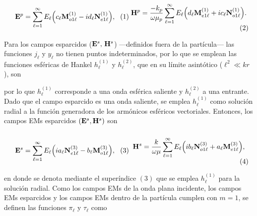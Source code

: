 	\begin{subequations}
	\eqhalf{\vb{E}^p = \sum_{\ell =1}^\infty E_\ell \qty(c_\ell \vb{M}_{o1\ell}^{(1)}-i d_\ell\vb{N}_{e1\ell}^{(1)}),	\label{eqs:EpAEV}}
	\eqhalf{\vb{H}^p = \frac{-k_p}{\omega\mu_p} \sum_{\ell =1}^\infty E_\ell\qty(d_\ell\vb{M}_{e1\ell}^{(1)}+i c_\ell\vb{N}_{o1\ell}^{(1)}).\label{eqs:HpAEV}}
	\label{eq:EHpAEV}		
	\end{subequations}\vspace*{-1em}

Para los campos esparcidos ($\vb{E}^s,\,\vb{H}^s$) ---definidos fuera de la partícula--- las funciones $j_\ell$ y $y_\ell$ no tienen puntos indeterminados, por lo que se emplean las funciones esféricas de Hankel $h_\ell^{(1)}$ y $h_\ell^{(2)}$, que en su límite asintótico ($\ell^2\ll kr$), son \cite{bohren1998absorption}


\vspace*{-1em}\noindent
por lo que $h_\ell^{(1)}$ corresponde a una onda esférica saliente y $h_\ell^{(2)}$ a una entrante. Dado que el campo esparcido es una onda saliente, se emplea $h_\ell^{(1)}$ como solución radial a la función generadora de los armónicos esféricos vectoriales. Entonces, los campos EMs esparcidos $(\vb{E}^s,\vb{H}^s)$ son 
	\begin{subequations}
	\eqhalf{\vb{E}^s = \sum_{\ell =1}^\infty E_\ell \qty(i a_\ell \vb{N}_{e1\ell}^{(3)}- b_\ell\vb{M}_{o1\ell}^{(3)}),
		\label{eqs:EsAEV}}
	\eqhalf{\vb{H}^s = \frac{k}{\omega\mu} \sum_{\ell =1}^\infty E_\ell\qty(ib_\ell\vb{N}_{o1\ell}^{(3)}+a_\ell\vb{M}_{e1\ell}^{(3)}),
		\label{eqs:HsAEV}}	
	\label{eq:EHsAEV}		
	\end{subequations}
		
\noindent
en donde se denota mediante el superíndice $(3)$ que se emplea $h_\ell^{(1)}$ para la solución radial. Como los campos EMs de la onda plana incidente, los campos EMs esparcidos y los campos EMs dentro de la partícula  cumplen con $m= 1$, se definen las funciones   $\pi_\ell$ y $\tau_\ell$ como   \vspace*{-1em}

